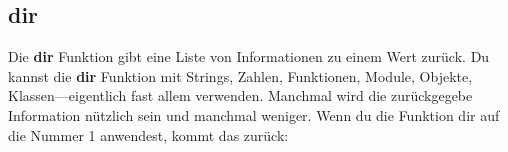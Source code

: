 




\subsection*{dir}

Die \textbf{dir} Funktion gibt eine Liste von Informationen zu einem Wert zurück. Du kannst die \textbf{dir} Funktion mit Strings, Zahlen, Funktionen, Module, Objekte, Klassen---eigentlich fast allem verwenden. Manchmal wird die zurückgegebe Information nützlich sein und manchmal weniger. Wenn du die Funktion dir auf die Nummer 1 anwendest, kommt das zurück:

